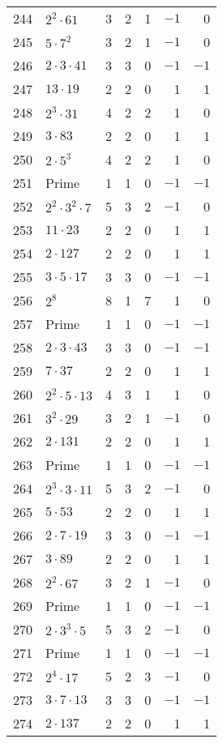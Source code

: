 \documentclass[12pt]{article}
\begin{document}
\begin{tabular}{|r|l|r|r|r|r|r|}
244 & $2^2 \cdot 61$ & 3 & 2 & 1 & $-1$ & 0 \\
245 & $5 \cdot 7^2$ & 3 & 2 & 1 & $-1$ & 0 \\
246 & $2 \cdot 3 \cdot 41$ & 3 & 3 & 0 & $-1$ & $-1$ \\
247 & $13 \cdot 19$ & 2 & 2 & 0 & 1 & 1 \\
248 & $2^3 \cdot 31$ & 4 & 2 & 2 & 1 & 0 \\
249 & $3 \cdot 83$ & 2 & 2 & 0 & 1 & 1 \\
250 & $2 \cdot 5^3$ & 4 & 2 & 2 & 1 & 0 \\
251 & Prime & 1 & 1 & 0 & $-1$ & $-1$ \\
252 & $2^2 \cdot 3^2 \cdot 7$ & 5 & 3 & 2 & $-1$ & 0 \\
253 & $11 \cdot 23$ & 2 & 2 & 0 & 1 & 1 \\
254 & $2 \cdot 127$ & 2 & 2 & 0 & 1 & 1 \\
255 & $3 \cdot 5 \cdot 17$ & 3 & 3 & 0 & $-1$ & $-1$ \\
256 & $2^8$ & 8 & 1 & 7 & 1 & 0 \\
257 & Prime & 1 & 1 & 0 & $-1$ & $-1$ \\
258 & $2 \cdot 3 \cdot 43$ & 3 & 3 & 0 & $-1$ & $-1$ \\
259 & $7 \cdot 37$ & 2 & 2 & 0 & 1 & 1 \\
260 & $2^2 \cdot 5 \cdot 13$ & 4 & 3 & 1 & 1 & 0 \\
261 & $3^2 \cdot 29$ & 3 & 2 & 1 & $-1$ & 0 \\
262 & $2 \cdot 131$ & 2 & 2 & 0 & 1 & 1 \\
263 & Prime & 1 & 1 & 0 & $-1$ & $-1$ \\
264 & $2^3 \cdot 3 \cdot 11$ & 5 & 3 & 2 & $-1$ & 0 \\
265 & $5 \cdot 53$ & 2 & 2 & 0 & 1 & 1 \\
266 & $2 \cdot 7 \cdot 19$ & 3 & 3 & 0 & $-1$ & $-1$ \\
267 & $3 \cdot 89$ & 2 & 2 & 0 & 1 & 1 \\
268 & $2^2 \cdot 67$ & 3 & 2 & 1 & $-1$ & 0 \\
269 & Prime & 1 & 1 & 0 & $-1$ & $-1$ \\
270 & $2 \cdot 3^3 \cdot 5$ & 5 & 3 & 2 & $-1$ & 0 \\
271 & Prime & 1 & 1 & 0 & $-1$ & $-1$ \\
272 & $2^4 \cdot 17$ & 5 & 2 & 3 & $-1$ & 0 \\
273 & $3 \cdot 7 \cdot 13$ & 3 & 3 & 0 & $-1$ & $-1$ \\
274 & $2 \cdot 137$ & 2 & 2 & 0 & 1 & 1 \\

\end{tabular}
\end{document}
